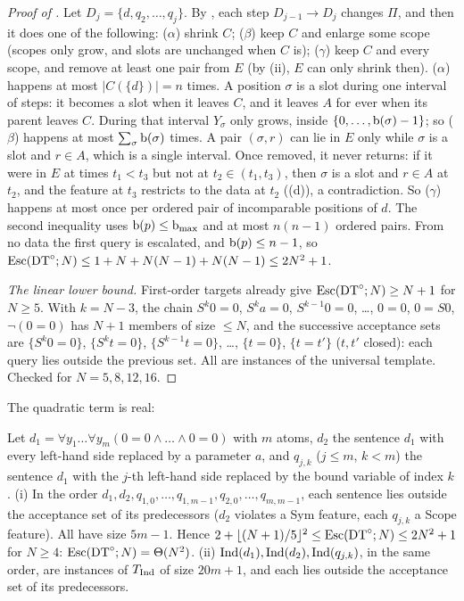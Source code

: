 \begin{proof}[Proof of ]
Let $D_j=\{d,q_2,\dots,q_j\}$. By , each step $D_{j-1}\to D_j$ changes $\Pi$, and then it does one of the following: ($\alpha$) shrink $C$; ($\beta$) keep $C$ and enlarge some scope (scopes only grow, and slots are unchanged when $C$ is); ($\gamma$) keep $C$ and every scope, and remove at least one pair from $E$ (by (ii), $E$ can only shrink then). ($\alpha$) happens at most $|C(\{d\})|=n$ times. A position $\sigma$ is a slot during one interval of steps: it becomes a slot when it leaves $C$, and it leaves $A$ for ever when its parent leaves $C$. During that interval $Y_\sigma$ only grows, inside $\{0,\dots,\mathrm{b}(\sigma)-1\}$; so ($\beta$) happens at most $\sum_\sigma\mathrm{b}(\sigma)$ times. A pair $(\sigma,r)$ can lie in $E$ only while $\sigma$ is a slot and $r\in A$, which is a single interval. Once removed, it never returns: if it were in $E$ at times $t_1<t_3$ but not at $t_2\in(t_1,t_3)$, then $\sigma$ is a slot and $r\in A$ at $t_2$, and the feature at $t_3$ restricts to the data at $t_2$ ((d)), a contradiction. So ($\gamma$) happens at most once per ordered pair of incomparable positions of $d$. The second inequality uses $\mathrm{b}(p)\le\mathrm{b}_{\max}$ and at most $n(n-1)$ ordered pairs. From no data the first query is escalated, and $\mathrm{b}(p)\le n-1$, so $\mathrm{Esc}(\mathrm{DT}^{\circ};N)\le1+N+N(N-1)+N(N-1)\le2N^2+1$.

\emph{The linear lower bound.} First-order targets already give $\mathrm{Esc}(\mathrm{DT}^{\circ};N)\ge N+1$ for $N\ge5$. With $k=N-3$, the chain $S^k0=0$, $S^ka=0$, $S^{k-1}0=0$, \dots, $0=0$, $0=S0$, $\neg(0=0)$ has $N+1$ members of size $\le N$, and the successive acceptance sets are $\{S^k0=0\}$, $\{S^kt=0\}$, $\{S^{k-1}t=0\}$, \dots, $\{t=0\}$, $\{t=t'\}$ ($t,t'$ closed): each query lies outside the previous set. All are instances of the universal template. Checked for $N=5,8,12,16$.
\end{proof}

The quadratic term is real:

\begin{proposition}\label{prop:single:quadratic}
Let $d_1=\forall y_1\dots\forall y_m(0=0\wedge\dots\wedge0=0)$ with $m$ atoms, $d_2$ the sentence $d_1$ with every left-hand side replaced by a parameter $a$, and $q_{j,k}$ ($j\le m$, $k<m$) the sentence $d_1$ with the $j$-th left-hand side replaced by the bound variable of index $k$.
(i) In the order $d_1,d_2,q_{1,0},\dots,q_{1,m-1},q_{2,0},\dots,q_{m,m-1}$, each sentence lies outside the acceptance set of its predecessors ($d_2$ violates a Sym feature, each $q_{j,k}$ a Scope feature). All have size $5m-1$. Hence $2+\lfloor(N+1)/5\rfloor^2\le\mathrm{Esc}(\mathrm{DT}^{\circ};N)\le2N^2+1$ for $N\ge4$: $\mathrm{Esc}(\mathrm{DT}^{\circ};N)=\Theta(N^2)$.
(ii) $\mathrm{Ind}(d_1),\mathrm{Ind}(d_2),\mathrm{Ind}(q_{j,k})$, in the same order, are instances of $T_{\mathrm{Ind}}$ of size $20m+1$, and each lies outside the acceptance set of its predecessors.
\end{proposition}

